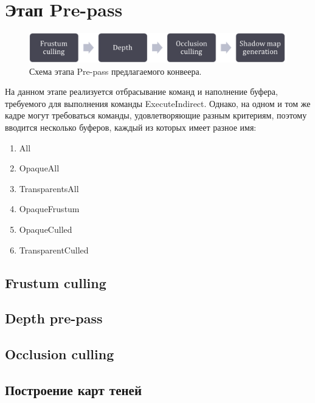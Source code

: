 \section{Этап Pre-pass} \label{ch3:pre_pass}
	\begin{figure}[ht!] 
		\center
		\includegraphics [scale=0.4] {my_folder/images//prepass_schema}	
		\caption{Схема этапа Pre-pass предлагаемого конвеера.} 
		\label{fig:prepass_schema}
	\end{figure}
	
	На данном этапе реализуется отбрасывание команд и наполнение буфера, требуемого для выполнения команды ExecuteIndirect. Однако, на одном и том же кадре могут требоваться команды, удовлетворяющие разным критериям, поэтому вводится несколько буферов, каждый из которых имеет разное имя:
	\begin{enumerate}[1.]
		\item All
		\item OpaqueAll
		\item TransparentsAll
		\item OpaqueFrustum
		\item OpaqueCulled
		\item TransparentCulled
	\end{enumerate}

	\subsection{Frustum culling} \label{ch3:pre_pass:frustum}
	\subsection{Depth pre-pass} \label{ch3:pre_pass:depth}
	\subsection{Occlusion culling} \label{ch3:pre_pass:occlusion}
	\subsection{Построение карт теней} \label{ch3:pre_pass:shadow_maps}